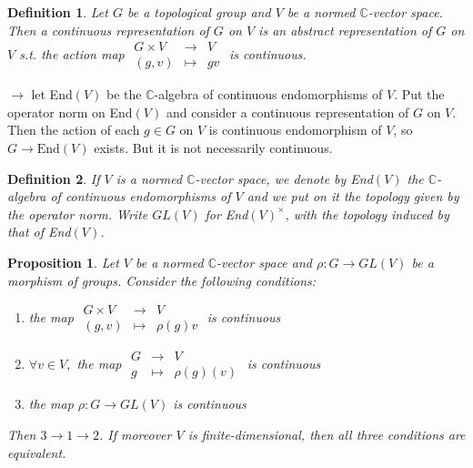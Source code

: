\documentclass[12pt,letterpaper]{report}
\newtheorem{definition}{Definition}[section]
\newtheorem{proposition}{Proposition}[section]
\begin{document}
\begin{definition}Let $G$ be a topological group and $V$ be a normed $\mathbb{C}$-vector space. Then a continuous representation of $G$ on $V$ is an abstract representation of $G$ on $V$ s.t. the action map $\begin{array}{rrr}G\times V&\rightarrow&V\\(g,v)&\mapsto&gv\end{array}$ is continuous.\end{definition}
$\rightarrow $ let End$(V)$ be the $\mathbb{C}$-algebra of continuous endomorphisms of $V$. Put the operator norm on End$(V)$ and consider a continuous representation of $G$ on $V$. Then the action of each $ g\in G$ on $V$ is continuous endomorphism of $V$, so $G\rightarrow \text{End}(V)$ exists. But it is not necessarily continuous. 
\begin{definition}If $V$ is a normed $\mathbb{C}$-vector space, we denote by End$(V)$ the $\mathbb{C}$-algebra of continuous endomorphisms of $V$ and we put on it the topology given by the operator norm. Write $GL(V)$ for End$(V)^{\times}$, with the topology induced by that of End$(V)$.\end{definition}
\begin{proposition}Let $V$ be a normed $\mathbb{C}$-vector space and $\rho:G\rightarrow GL(V)$ be a morphism of groups. Consider the following conditions: \begin{enumerate}\item the map $\begin{array}{rrr}G\times V&\rightarrow&V\\(g,v)&\mapsto&\rho(g)v\end{array}$ is continuous\item $\forall v\in V,$ the map $\begin{array}{rrr}G&\rightarrow&V\\g&\mapsto&\rho(g)(v)\end{array}$ is continuous\item the map $\rho:G\rightarrow GL(V)$ is continuous\end{enumerate} Then $3\rightarrow 1\rightarrow 2$. If moreover $V$ is finite-dimensional, then all three conditions are equivalent.\end{proposition}
\end{document}
